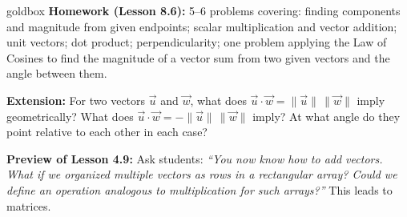 \documentclass[10pt]{article}
\begin{document}
\vspace{0.08in}

\begin{skillbox}{goldbox}
\textbf{Homework (Lesson 8.6):} 5--6 problems covering: finding components
and magnitude from given endpoints; scalar multiplication and vector addition;
unit vectors; dot product; perpendicularity; one problem applying the Law of
Cosines to find the magnitude of a vector sum from two given vectors and the
angle between them.

\textbf{Extension:} For two vectors $\vec{u}$ and $\vec{w}$, what does
$\vec{u}\cdot\vec{w}=\|\vec{u}\|\,\|\vec{w}\|$ imply geometrically? What does
$\vec{u}\cdot\vec{w}=-\|\vec{u}\|\,\|\vec{w}\|$ imply? At what angle do they
point relative to each other in each case?

\textbf{Preview of Lesson 4.9:} Ask students:
\textit{``You now know how to add vectors. What if we organized multiple
vectors as rows in a rectangular array? Could we define an operation
analogous to multiplication for such arrays?''} This leads to matrices.
\end{skillbox}
\end{document}
